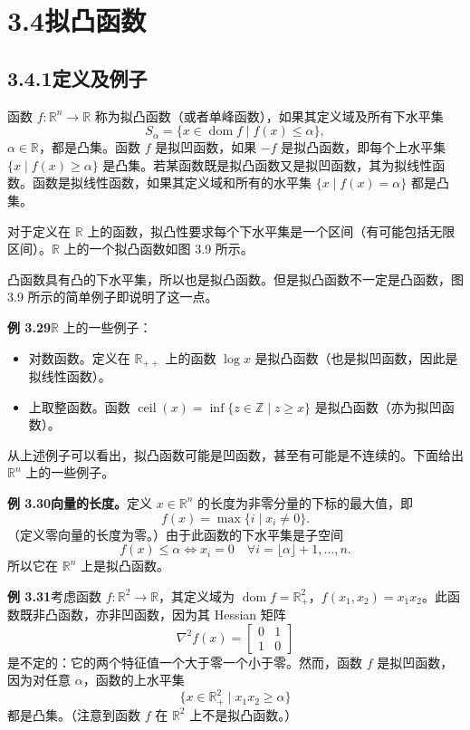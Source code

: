 \documentclass[UTF8, 12pt, fontset=fandol, oneside]{ctexart}
\DeclareMathOperator{\dom}{dom}
\begin{document}
\section*{3.4\quad 拟凸函数}

\subsection*{3.4.1\quad 定义及例子}

函数 $f:\mathbb{R}^n\to\mathbb{R}$ 称为拟凸函数（或者单峰函数），如果其定义域及所有下水平集
\[
S_\alpha=\{x\in\dom f\mid f(x)\leq\alpha\},
\]
$\alpha\in\mathbb{R}$，都是凸集。函数 $f$ 是拟凹函数，如果 $-f$ 是拟凸函数，即每个上水平集 $\{x\mid f(x)\geq\alpha\}$ 是凸集。若某函数既是拟凸函数又是拟凹函数，其为拟线性函数。函数是拟线性函数，如果其定义域和所有的水平集 $\{x\mid f(x)=\alpha\}$ 都是凸集。

对于定义在 $\mathbb{R}$ 上的函数，拟凸性要求每个下水平集是一个区间（有可能包括无限区间）。$\mathbb{R}$ 上的一个拟凸函数如图 3.9 所示。

凸函数具有凸的下水平集，所以也是拟凸函数。但是拟凸函数不一定是凸函数，图 3.9 所示的简单例子即说明了这一点。

\noindent\textbf{例 3.29}\quad $\mathbb{R}$ 上的一些例子：
\begin{itemize}
\item 对数函数。定义在 $\mathbb{R}_{++}$ 上的函数 $\log x$ 是拟凸函数（也是拟凹函数，因此是拟线性函数）。
\item 上取整函数。函数 $\operatorname{ceil}(x)=\inf\{z\in\mathbb{Z}\mid z\geq x\}$ 是拟凸函数（亦为拟凹函数）。
\end{itemize}

从上述例子可以看出，拟凸函数可能是凹函数，甚至有可能是不连续的。下面给出 $\mathbb{R}^n$ 上的一些例子。

\noindent\textbf{例 3.30\quad 向量的长度。}\quad 定义 $x\in\mathbb{R}^n$ 的长度为非零分量的下标的最大值，即
\[
f(x)=\max\{i\mid x_i\neq0\}.
\]
（定义零向量的长度为零。）由于此函数的下水平集是子空间
\[
f(x)\leq\alpha\Longleftrightarrow x_i=0\quad \forall i=\lfloor\alpha\rfloor+1,\ldots,n.
\]
所以它在 $\mathbb{R}^n$ 上是拟凸函数。

\noindent\textbf{例 3.31}\quad 考虑函数 $f:\mathbb{R}^2\to\mathbb{R}$，其定义域为 $\dom f=\mathbb{R}_+^2$，$f(x_1,x_2)=x_1x_2$。此函数既非凸函数，亦非凹函数，因为其 Hessian 矩阵
\[
\nabla^2 f(x)=
\begin{bmatrix}
0 & 1\\
1 & 0
\end{bmatrix}
\]
是不定的：它的两个特征值一个大于零一个小于零。然而，函数 $f$ 是拟凹函数，因为对任意 $\alpha$，函数的上水平集
\[
\{x\in\mathbb{R}_+^2\mid x_1x_2\geq\alpha\}
\]
都是凸集。（注意到函数 $f$ 在 $\mathbb{R}^2$ 上不是拟凸函数。）
\end{document}
